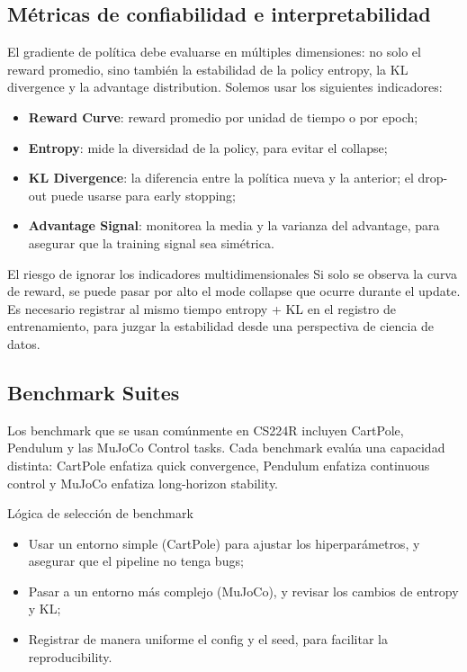 \documentclass[a4paper]{article}
\begin{document}
\subsection{Métricas de confiabilidad e interpretabilidad}
El gradiente de política debe evaluarse en múltiples dimensiones: no solo el reward promedio, sino también la estabilidad de la policy entropy, la KL divergence y la advantage distribution. Solemos usar los siguientes indicadores:
\begin{itemize}
    \item \textbf{Reward Curve}: reward promedio por unidad de tiempo o por epoch;
    \item \textbf{Entropy}: mide la diversidad de la policy, para evitar el collapse;
    \item \textbf{KL Divergence}: la diferencia entre la política nueva y la anterior; el drop-out puede usarse para early stopping;
    \item \textbf{Advantage Signal}: monitorea la media y la varianza del advantage, para asegurar que la training signal sea simétrica.
\end{itemize}

\begin{warningbox}{El riesgo de ignorar los indicadores multidimensionales}
Si solo se observa la curva de reward, se puede pasar por alto el mode collapse que ocurre durante el update. Es necesario registrar al mismo tiempo entropy + KL en el registro de entrenamiento, para juzgar la estabilidad desde una perspectiva de ciencia de datos.
\end{warningbox}

\subsection{Benchmark Suites}
Los benchmark que se usan comúnmente en CS224R incluyen CartPole, Pendulum y las MuJoCo Control tasks. Cada benchmark evalúa una capacidad distinta: CartPole enfatiza quick convergence, Pendulum enfatiza continuous control y MuJoCo enfatiza long-horizon stability.

\begin{importantbox}{Lógica de selección de benchmark}
\begin{itemize}
    \item Usar un entorno simple (CartPole) para ajustar los hiperparámetros, y asegurar que el pipeline no tenga bugs;
    \item Pasar a un entorno más complejo (MuJoCo), y revisar los cambios de entropy y KL;
\item Registrar de manera uniforme el config y el seed, para facilitar la reproducibility.
\end{itemize}
\end{importantbox}
\end{document}

